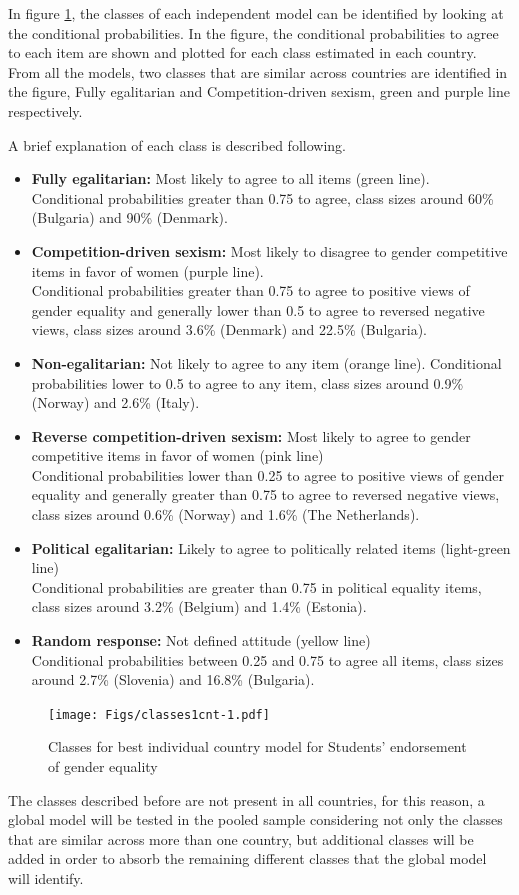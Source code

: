 \documentclass[12pt,a4paper,oneside]{reedthesis}
\begin{document}
In figure \ref{fig:classes1cnt}, the classes of each independent model can be identified by looking at the conditional probabilities. In the figure, the conditional probabilities to agree to each item are shown and plotted for each class estimated in each country. From all the models, two classes that are similar across countries are identified in the figure, Fully egalitarian and Competition-driven sexism, green and purple line respectively.

A brief explanation of each class is described following.
\begin{itemize}
\item
  \textbf{Fully egalitarian:} Most likely to agree to all items (green line).\\
  Conditional probabilities greater than 0.75 to agree, class sizes around 60\% (Bulgaria) and 90\% (Denmark).
\item
  \textbf{Competition-driven sexism:} Most likely to disagree to gender competitive items in favor of women (purple line).\\
  Conditional probabilities greater than 0.75 to agree to positive views of gender equality and generally lower than 0.5 to agree to reversed negative views, class sizes around 3.6\% (Denmark) and 22.5\% (Bulgaria).
\item
  \textbf{Non-egalitarian:} Not likely to agree to any item (orange line).
  Conditional probabilities lower to 0.5 to agree to any item, class sizes around 0.9\% (Norway) and 2.6\% (Italy).
\item
  \textbf{Reverse competition-driven sexism:} Most likely to agree to gender competitive items in favor of women (pink line)\\
  Conditional probabilities lower than 0.25 to agree to positive views of gender equality and generally greater than 0.75 to agree to reversed negative views, class sizes around 0.6\% (Norway) and 1.6\% (The Netherlands).
\item
  \textbf{Political egalitarian:} Likely to agree to politically related items (light-green line)\\
  Conditional probabilities are greater than 0.75 in political equality items, class sizes around 3.2\% (Belgium) and 1.4\% (Estonia).
\item
  \textbf{Random response:} Not defined attitude (yellow line)\\
  Conditional probabilities between 0.25 and 0.75 to agree all items, class sizes around 2.7\% (Slovenia) and 16.8\% (Bulgaria).
\end{itemize}
\begin{figure}
\centering
\texttt{[image: Figs/classes1cnt-1.pdf]}
\caption{\label{fig:classes1cnt}Classes for best individual country model for Students' endorsement of gender equality}
\end{figure}
The classes described before are not present in all countries, for this reason, a global model will be tested in the pooled sample considering not only the classes that are similar across more than one country, but additional classes will be added in order to absorb the remaining different classes that the global model will identify.
\end{document}
